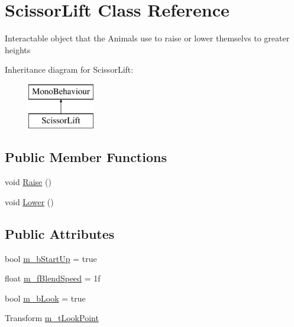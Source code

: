 \hypertarget{class_scissor_lift}{}\section{Scissor\+Lift Class Reference}
\label{class_scissor_lift}


Interactable object that the Animals use to raise or lower themselvs to greater heights  


Inheritance diagram for Scissor\+Lift\+:\begin{figure}[H]
\begin{center}
\leavevmode
\includegraphics[height=2.000000cm]{class_scissor_lift}
\end{center}
\end{figure}
\subsection*{Public Member Functions}
\begin{DoxyCompactItemize}
\item 
void \mbox{\hyperlink{class_scissor_lift_a47374be94fb3d0f9a627c26deaec392b}{Raise}} ()
\item 
void \mbox{\hyperlink{class_scissor_lift_ae039f48df315a5aa533d468ac5e45a5e}{Lower}} ()
\end{DoxyCompactItemize}
\subsection*{Public Attributes}
\begin{DoxyCompactItemize}
\item 
bool \mbox{\hyperlink{class_scissor_lift_afd8b90f872372fd738ccc5b52dc672f0}{m\+\_\+b\+Start\+Up}} = true
\item 
float \mbox{\hyperlink{class_scissor_lift_ab25007401427378cb15e910f0f72af85}{m\+\_\+f\+Blend\+Speed}} = 1f
\item 
bool \mbox{\hyperlink{class_scissor_lift_a0154e3d3c0d4b52b280058a4338c8e60}{m\+\_\+b\+Look}} = true
\item 
Transform \mbox{\hyperlink{class_scissor_lift_ad10e7174e2bf2c6ba4d0b5456d83dd7b}{m\+\_\+t\+Look\+Point}}
\end{DoxyCompactItemize}



